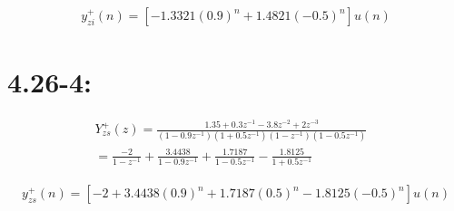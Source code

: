 \documentclass[11pt
  , a4paper
  , article
  , oneside
]{memoir}
\begin{document}
\begin {equation}
\begin {split}
y^+_{zi}(n)= [-1.3321(0.9)^n + 1.4821(-0.5)^n]u(n)
\nonumber
\end{split}
\end {equation}

\section{4.26-4:}
\begin {equation}
\begin {split}
Y^+_{zs}(z)=\frac{1.35+0.3z^{-1}-3.8z^{-2}+2z^{-3}}{(1-0.9z^{-1})(1+0.5z^{-1})(1-z^{-1})(1-0.5z^{-1})} &\\ = \frac{-2}{1-z^{-1}} + \frac{3.4438}{1-0.9z^{-1}} +\frac{1.7187}{1-0.5z^{-1}} - \frac{1.8125}{1+0.5z^{-1}} 
\nonumber
\end{split}
\end {equation}

\begin {equation}
\begin {split}
y^+_{zs}(n)= [-2 + 3.4438(0.9)^n + 1.7187(0.5)^n - 1.8125(-0.5)^n]u(n)
\nonumber
\end{split}
\end {equation}
\end{document}
